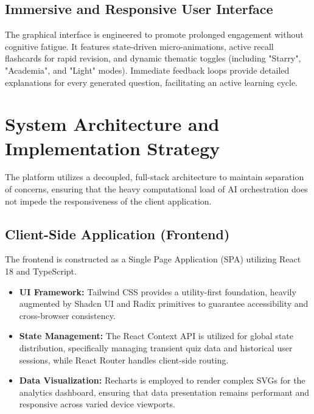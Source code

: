 \documentclass[12pt,a4paper]{article}
\begin{document}
\subsection{Immersive and Responsive User Interface}
The graphical interface is engineered to promote prolonged engagement without cognitive fatigue. It features state-driven micro-animations, active recall flashcards for rapid revision, and dynamic thematic toggles (including "Starry", "Academia", and "Light" modes). Immediate feedback loops provide detailed explanations for every generated question, facilitating an active learning cycle.

\section{System Architecture and Implementation Strategy}
The platform utilizes a decoupled, full-stack architecture to maintain separation of concerns, ensuring that the heavy computational load of AI orchestration does not impede the responsiveness of the client application.

\subsection{Client-Side Application (Frontend)}
The frontend is constructed as a Single Page Application (SPA) utilizing React 18 and TypeScript.
\begin{itemize}[leftmargin=1.5cm]
    \item \textbf{UI Framework:} Tailwind CSS provides a utility-first foundation, heavily augmented by Shadcn UI and Radix primitives to guarantee accessibility and cross-browser consistency.
    \item \textbf{State Management:} The React Context API is utilized for global state distribution, specifically managing transient quiz data and historical user sessions, while React Router handles client-side routing.
    \item \textbf{Data Visualization:} Recharts is employed to render complex SVGs for the analytics dashboard, ensuring that data presentation remains performant and responsive across varied device viewports.
\end{itemize}
\end{document}
